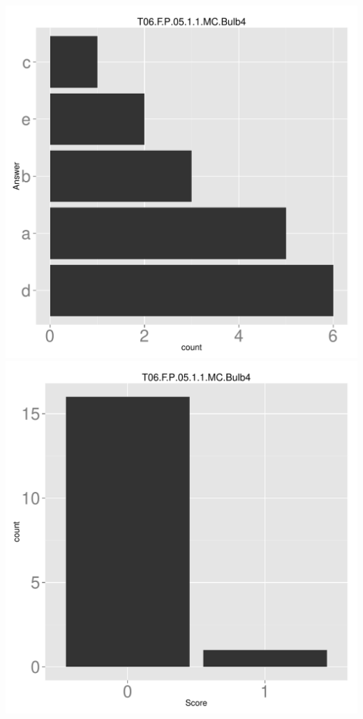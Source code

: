\documentclass[12pt,nohyper]{tufte-handout}\usepackage[]{graphicx}\usepackage[]{color}
\begin{document}
\begin{center} \includegraphics[width=.45\linewidth]{Topic06_61_answer} \includegraphics[width=.45\linewidth]{Topic06_61_score} \end{center} 
\end{document}
